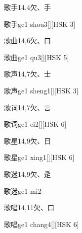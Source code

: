 \begin{Entry}{歌手}{14,4}{⽋、⼿}
  \begin{Phonetics}{歌手}{ge1 shou3}[][HSK 3]
  \end{Phonetics}
\end{Entry}

\begin{Entry}{歌曲}{14,6}{⽋、⽈}
  \begin{Phonetics}{歌曲}{ge1 qu3}[][HSK 5]
  \end{Phonetics}
\end{Entry}

\begin{Entry}{歌声}{14,7}{⽋、⼠}
  \begin{Phonetics}{歌声}{ge1 sheng1}[][HSK 3]
  \end{Phonetics}
\end{Entry}

\begin{Entry}{歌词}{14,7}{⽋、⾔}
  \begin{Phonetics}{歌词}{ge1 ci2}[][HSK 6]
  \end{Phonetics}
\end{Entry}

\begin{Entry}{歌星}{14,9}{⽋、⽇}
  \begin{Phonetics}{歌星}{ge1 xing1}[][HSK 6]
  \end{Phonetics}
\end{Entry}

\begin{Entry}{歌迷}{14,9}{⽋、⾡}
  \begin{Phonetics}{歌迷}{ge1 mi2}
  \end{Phonetics}
\end{Entry}

\begin{Entry}{歌唱}{14,11}{⽋、⼝}
  \begin{Phonetics}{歌唱}{ge1 chang4}[][HSK 6]
  \end{Phonetics}
\end{Entry}

